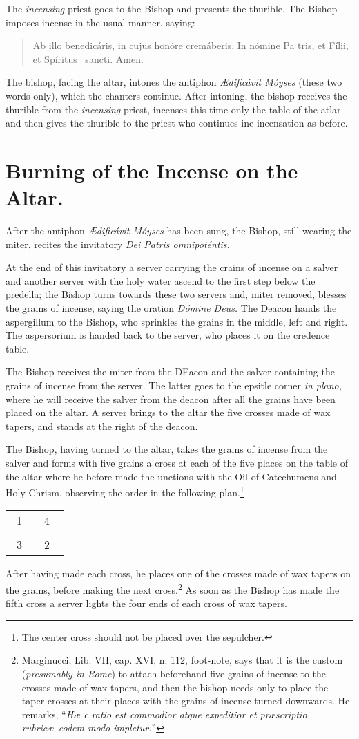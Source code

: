 \documentclass[letterpaper]{report}
\newcommand\blessincense{
\begin{quote}
   Ab illo benedicáris, in cujus honóre cremáberis. In nómine Pa\cross
    tris, et Fí\cross lii, et Spíritus \cross\ sancti. \rbar Amen.
\end{quote}
}
\newcommand\crossplan{
\begin{center}
    \begin{tabular}{ | l c r | }
       \hline
        \cross\ {\tiny 1} &         & {\tiny 4} \cross\ \\
                           & \cross &           \\
        \cross\ {\tiny 3} &         & {\tiny 2} \cross\ \\
       \hline
   \end{tabular} 
\end{center}
}
\begin{document}
{\rubric The \textit{incensing} priest goes to the Bishop and presents the
thurible. The Bishop imposes incense in the usual manner, saying:

\blessincense

The bishop, facing the altar, intones the antiphon \textit{\AE dificávit
Móyses} (these two words only), which the chanters continue. After intoning,
the bishop receives the thurible from the \textit{incensing} priest, incenses
this time only the table of the atlar and then gives the thurible to the priest
who continues ine incensation as before.

\section{Burning of the Incense on the Altar.}

\rubric After the antiphon \textit{\AE dificávit Móyses} has been sung, the
Bishop, still wearing the miter, recites the invitatory \textit{Dei Patris
omnipoténtis.}

\rubric At the end of this invitatory a server carrying the crains of incense
on a salver and another server with the holy water ascend to the first step
below the predella; the Bishop turns towards these two servers and, miter
removed, blesses the grains of incense, saying the oration \textit{Dómine
Deus.} The Deacon hands the aspergillum to the Bishop, who sprinkles the grains in
the middle, left and right. The aspersorium is handed back to the server, who
places it on the credence table.

The Bishop receives the miter from the DEacon and the salver containing the
grains of incense from the server. The latter goes to the epsitle corner
\textit{in plano,} where he will receive the salver from the deacon after all
the grains have been placed on the altar. A server brings to the altar the five
crosses made of wax tapers, and stands at the right of the deacon.

\rubric The Bishop, having turned to the altar, takes the grains of incense
from the salver and forms with five grains a cross at each of the five places
on the table of the altar where he before made the unctions with the Oil of
Catechumens and Holy Chrism, observing the order in the following
plan.\footnote{The center cross should not be placed over the sepulcher.}

\crossplan

After having made each cross, he places one of the crosses made of wax tapers
on the grains, before making the next cross.\footnote{Marginucci, Lib. VII,
cap. XVI, n. 112, foot-note, says that it is the custom (\textit{presumably in
Rome}) to attach beforehand five grains of incense to the crosses made of wax
tapers, and then the bishop needs only to place the taper-crosses at their
places with the grains of incense turned downwards. He remarks, ``\textit{H\ae
c ratio est commodior atque expeditior et pr\ae scriptio rubric\ae\ eodem modo
impletur.}''} As soon as the Bishop has made the fifth cross a server lights
the four ends of each cross of wax tapers.

}
\end{document}
